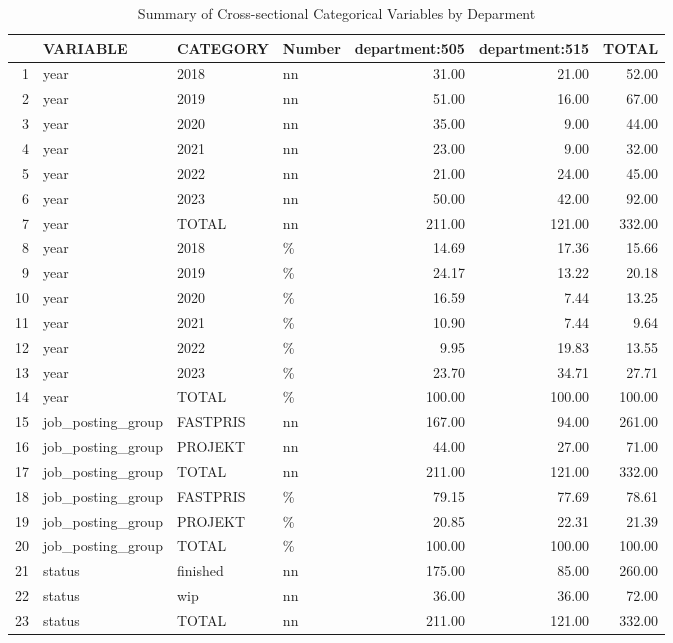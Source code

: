 \begin{sidewaystable}[ht]
\centering
\caption{Summary of Cross-sectional Categorical Variables by Deparment} 
\begin{tabular}{rlllrrr}
  \hline
 & VARIABLE & CATEGORY & Number & department:505 & department:515 & TOTAL \\ 
  \hline
1 & year & 2018 & nn & 31.00 & 21.00 & 52.00 \\ 
  2 & year & 2019 & nn & 51.00 & 16.00 & 67.00 \\ 
  3 & year & 2020 & nn & 35.00 & 9.00 & 44.00 \\ 
  4 & year & 2021 & nn & 23.00 & 9.00 & 32.00 \\ 
  5 & year & 2022 & nn & 21.00 & 24.00 & 45.00 \\ 
  6 & year & 2023 & nn & 50.00 & 42.00 & 92.00 \\ 
  7 & year & TOTAL & nn & 211.00 & 121.00 & 332.00 \\ 
  8 & year & 2018 & \% & 14.69 & 17.36 & 15.66 \\ 
  9 & year & 2019 & \% & 24.17 & 13.22 & 20.18 \\ 
  10 & year & 2020 & \% & 16.59 & 7.44 & 13.25 \\ 
  11 & year & 2021 & \% & 10.90 & 7.44 & 9.64 \\ 
  12 & year & 2022 & \% & 9.95 & 19.83 & 13.55 \\ 
  13 & year & 2023 & \% & 23.70 & 34.71 & 27.71 \\ 
  14 & year & TOTAL & \% & 100.00 & 100.00 & 100.00 \\ 
  15 & job\_posting\_group & FASTPRIS & nn & 167.00 & 94.00 & 261.00 \\ 
  16 & job\_posting\_group & PROJEKT & nn & 44.00 & 27.00 & 71.00 \\ 
  17 & job\_posting\_group & TOTAL & nn & 211.00 & 121.00 & 332.00 \\ 
  18 & job\_posting\_group & FASTPRIS & \% & 79.15 & 77.69 & 78.61 \\ 
  19 & job\_posting\_group & PROJEKT & \% & 20.85 & 22.31 & 21.39 \\ 
  20 & job\_posting\_group & TOTAL & \% & 100.00 & 100.00 & 100.00 \\ 
  21 & status & finished & nn & 175.00 & 85.00 & 260.00 \\ 
  22 & status & wip & nn & 36.00 & 36.00 & 72.00 \\ 
  23 & status & TOTAL & nn & 211.00 & 121.00 & 332.00 \\ 

\end{tabular}
\end{sidewaystable}

